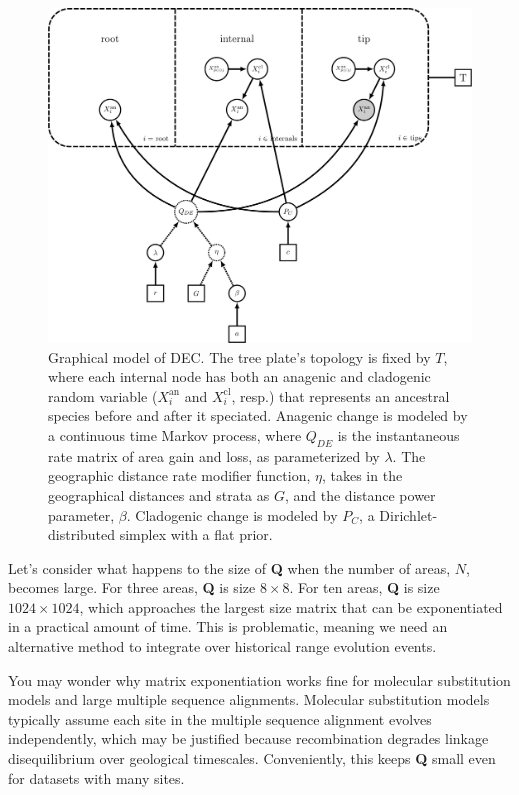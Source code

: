 \documentclass[11pt]{article}
\begin{document}
\begin{figure}[H]
\centering
\includegraphics[width=5in]{figures/bg_dec_dag}
\caption{Graphical model of DEC. The tree plate's topology is fixed by $T$, where each internal node has both an anagenic and cladogenic random variable ($X_i^{\text{an}}$ and $X_i^{\text{cl}}$, resp.) that represents an ancestral species before and after it speciated. Anagenic change is modeled by a continuous time Markov process, where $Q_{DE}$ is the instantaneous rate matrix of area gain and loss, as parameterized by $\lambda$. The geographic distance rate modifier function, $\eta$, takes in the geographical distances and strata as $G$, and the distance power parameter, $\beta$. Cladogenic change is modeled by $P_C$, a Dirichlet-distributed simplex with a flat prior.}
\end{figure}

Let's consider what happens to the size of \textbf{Q} when the number of areas, $N$, becomes large.
For three areas, \textbf{Q} is size $8 \times 8$.
For ten areas, \textbf{Q} is size $1024 \times 1024$, which approaches the largest size matrix that can be exponentiated in a practical amount of time.
This is problematic, meaning we need an alternative method to integrate over historical range evolution events.

You may wonder why matrix exponentiation works fine for molecular substitution models and large multiple sequence alignments.
Molecular substitution models typically assume each site in the multiple sequence alignment evolves independently, which may be justified because recombination degrades linkage disequilibrium over geological timescales.
Conveniently, this keeps \textbf{Q} small even for datasets with many sites.
\end{document}
